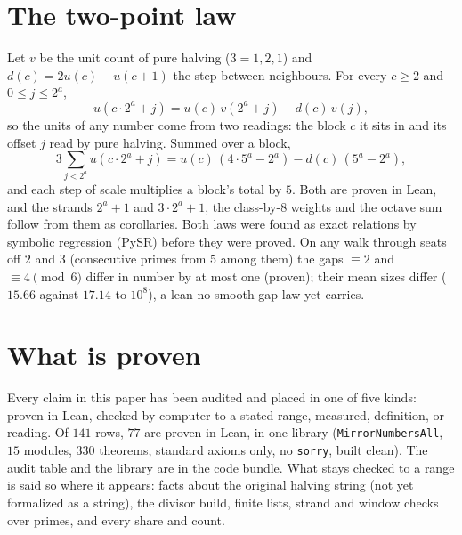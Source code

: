 \documentclass[11pt]{article}
\begin{document}
\section{The two-point law}
Let $v$ be the unit count of pure halving ($3 = 1,2,1$) and $d(c) = 2u(c) - u(c+1)$ the step between neighbours. For every $c\ge2$ and $0\le j\le 2^a$,
\[ u(c\cdot2^a + j) = u(c)\,v(2^a+j) - d(c)\,v(j), \]
so the units of any number come from two readings: the block $c$ it sits in and its offset $j$ read by pure halving. Summed over a block,
\[ 3\sum_{j<2^a} u(c\cdot2^a+j) = u(c)\,(4\cdot5^a - 2^a) - d(c)\,(5^a-2^a), \]
and each step of scale multiplies a block's total by $5$. Both are proven in Lean, and the strands $2^a+1$ and $3\cdot2^a+1$, the class-by-$8$ weights and the octave sum follow from them as corollaries. Both laws were found as exact relations by symbolic regression (PySR) before they were proved. On any walk through seats off $2$ and $3$ (consecutive primes from $5$ among them) the gaps $\equiv 2$ and $\equiv 4 \pmod 6$ differ in number by at most one (proven); their mean sizes differ ($15.66$ against $17.14$ to $10^8$), a lean no smooth gap law yet carries.

\section{What is proven}
Every claim in this paper has been audited and placed in one of five kinds: proven in Lean, checked by computer to a stated range, measured, definition, or reading. Of $141$ rows, $77$ are proven in Lean, in one library (\texttt{MirrorNumbersAll}, $15$ modules, $330$ theorems, standard axioms only, no \texttt{sorry}, built clean). The audit table and the library are in the code bundle. What stays checked to a range is said so where it appears: facts about the original halving string (not yet formalized as a string), the divisor build, finite lists, strand and window checks over primes, and every share and count.
\end{document}

